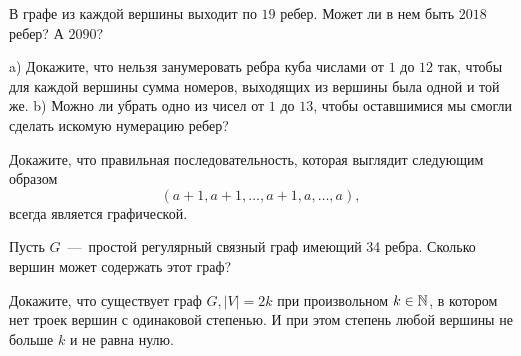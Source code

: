 \begin{exersize}
	В графе из каждой вершины выходит по $19$ ребер. Может ли в нем быть $2018$ ребер? А $2090$?
\end{exersize}

\begin{exersize}
	a) Докажите, что нельзя занумеровать ребра куба числами от $1$ до $12$ так, чтобы для каждой вершины сумма номеров, 
	выходящих из вершины была одной и той же. b) Можно ли убрать одно из чисел от $1$ до $13$, 
	чтобы оставшимися мы смогли сделать искомую нумерацию ребер?
\end{exersize}

\begin{exersize}
	Докажите, что правильная последовательность, которая выглядит следующим образом
	$$(a+1, a+1, \dots, a+1, a, \dots, a),$$
	всегда является графической.
\end{exersize}

\begin{exersize}
	Пусть $G$~---~простой регулярный связный граф имеющий 34 ребра. Сколько вершин может содержать этот граф?
\end{exersize}

\begin{exersize}
	Докажите, что существует граф $G, |V| = 2k$ при произвольном $k \in \mathbb{N}$, в котором нет троек вершин с одинаковой степенью. 
	И при этом степень любой вершины не больше $k$ и не равна нулю.
\end{exersize}
